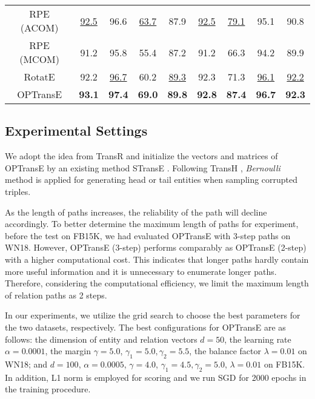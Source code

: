 \documentclass[11pt,a4paper]{article}
\begin{document}
\begin{table*}[]
\begin{tabular}{|c|cccc|cccc|}
RPE (ACOM)         & \underline{92.5}         & 96.6        & \underline{63.7}        & 87.9        & \underline{92.5}         & \underline{79.1}        & 95.1        & 90.8       \\
RPE (MCOM)           & 91.2         & 95.8             & 55.4         & 87.2             & 91.2         & 66.3             & 94.2         & 89.9             \\
RotatE          & 92.2         & \underline{96.7}             & 60.2         & \underline{89.3}             & 92.3         & 71.3             & \underline{96.1}         & \underline{92.2}             \\
\hline
OPTransE          & \bf93.1         & \bf97.4        & \bf69.0        & \bf89.8        & \bf92.8         & \bf87.4        & \bf96.7        & \bf{92.3}       \\
\hline
\end{tabular}
\end{table*}





\subsection{Experimental Settings}

We adopt the idea from TransR \cite{lin2015learning} and initialize
the vectors and matrices of OPTransE by an existing method STransE
\cite{nguyen2016stranse}. Following TransH \cite{wang2014knowledge},
\emph{Bernoulli} method is applied for generating head or tail
entities when sampling corrupted triples.

As the length of paths increases, the reliability of the path will
decline accordingly. To better determine the maximum length of paths
for experiment, before the test on FB15K, we had evaluated OPTransE
with 3-step paths on WN18. However, OPTransE (3-step) performs
comparably as OPTransE (2-step) with a higher computational cost.
This indicates that longer paths hardly contain more useful information
and it is unnecessary to enumerate longer paths. Therefore,
considering the computational efficiency, we limit the maximum
length of relation paths as 2 steps.

In our experiments, we utilize the grid search to choose the best
parameters for the two datasets, respectively. The best configurations for OPTransE are as follows: the dimension
of entity and relation vectors \(d = 50 \), the
learning rate \(\alpha = 0.0001 \), the margin \(\gamma = 5.0 \), \(\gamma_{1} = 5.0, \gamma_{2} = 5.5 \), the balance factor \(\lambda = 0.01 \) on WN18; and \(d = 100 \), \(\alpha = 0.0005 \), \(\gamma = 4.0 \), \(\gamma_{1} = 4.5, \gamma_{2} = 5.0 \), \(\lambda = 0.01 \) on FB15K. In addition, L1 norm is
employed for scoring and we run SGD for 2000 epochs in the training
procedure.
\end{document}
